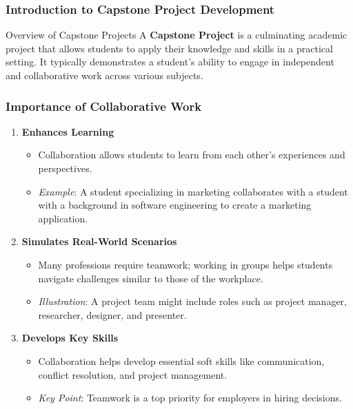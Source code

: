 \documentclass[aspectratio=169]{beamer}
\begin{document}
\frame{\titlepage}

\begin{frame}[fragile]
    \frametitle{Introduction to Capstone Project Development}
    \begin{block}{Overview of Capstone Projects}
        A \textbf{Capstone Project} is a culminating academic project that allows students to apply their knowledge and skills in a practical setting.
        It typically demonstrates a student's ability to engage in independent and collaborative work across various subjects.
    \end{block}
\end{frame}

\begin{frame}[fragile]
    \frametitle{Importance of Collaborative Work}
    \begin{enumerate}
        \item \textbf{Enhances Learning}
        \begin{itemize}
            \item Collaboration allows students to learn from each other's experiences and perspectives.
            \item \textit{Example}: A student specializing in marketing collaborates with a student with a background in software engineering to create a marketing application.
        \end{itemize}
        
        \item \textbf{Simulates Real-World Scenarios}
        \begin{itemize}
            \item Many professions require teamwork; working in groups helps students navigate challenges similar to those of the workplace.
            \item \textit{Illustration}: A project team might include roles such as project manager, researcher, designer, and presenter.
        \end{itemize}
        
        \item \textbf{Develops Key Skills}
        \begin{itemize}
            \item Collaboration helps develop essential soft skills like communication, conflict resolution, and project management.
            \item \textit{Key Point}: Teamwork is a top priority for employers in hiring decisions.
        \end{itemize}
    \end{enumerate}
\end{frame}
\end{document}
